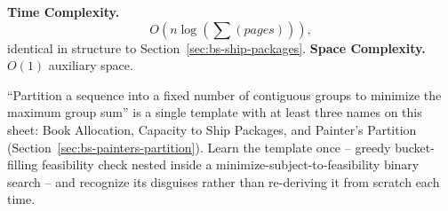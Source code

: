 \begin{complexitybox}
\textbf{Time Complexity.}
\[
  O(n \log(\sum(\textit{pages}))),
\]
identical in structure to Section~\ref{sec:bs-ship-packages}.
\textbf{Space Complexity.} $O(1)$ auxiliary space.
\end{complexitybox}

\begin{takeawaybox}
``Partition a sequence into a fixed number of contiguous groups to
minimize the maximum group sum'' is a single template with at least three
names on this sheet: Book Allocation, Capacity to Ship Packages, and
Painter's Partition (Section~\ref{sec:bs-painters-partition}). Learn the
template once -- greedy bucket-filling feasibility check nested inside a
minimize-subject-to-feasibility binary search -- and recognize its
disguises rather than re-deriving it from scratch each time.
\end{takeawaybox}
